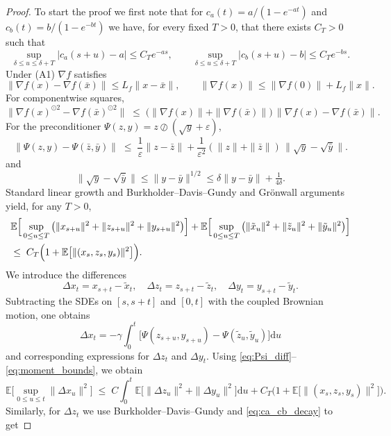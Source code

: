 \documentclass[11pt, a4paper,leqno]{amsart}
\theoremstyle{definition}
\numberwithin{equation}{section}
\begin{document}
\begin{proof}
To start the proof we first note that for $c_a(t)=a/(1-e^{-at})$ and $c_b(t)=b/(1-e^{-bt})$ we have, for every fixed $T>0$, that there exists $C_T>0$ such that
\begin{equation}\label{eq:ca_cb_decay}
\sup_{\delta\le u\le \delta+T}\bigl|c_a(s+u)-a\bigr| \le C_T e^{-as},\qquad
\sup_{\delta\le u\le \delta+T}\bigl|c_b(s+u)-b\bigr| \le C_T e^{-bs}.
\end{equation}
Under (A1)  $\nabla f$ satisfies
\[
\|\nabla f(x)-\nabla f(\bar x)\|\le L_f\|x-\bar x\|,\qquad
\|\nabla f(x)\|\le \|\nabla f(0)\|+L_f\|x\|.
\]
For componentwise squares,
\begin{equation}\label{eq:square_diff}
\|\nabla f(x)^{\odot 2}-\nabla f(\bar x)^{\odot 2}\|
\;\le\; \big(\|\nabla f(x)\|+\|\nabla f(\bar x)\|\big)\,\|\nabla f(x)-\nabla f(\bar x)\|.
\end{equation}
For the preconditioner $\Psi(z,y)=z\oslash(\sqrt{y}+\varepsilon)$,
\begin{equation}\label{eq:Psi_diff}
\|\Psi(z,y)-\Psi(\bar z,\bar y)\|
\;\le\; \frac{1}{\varepsilon}\|z-\bar z\|
+\frac{1}{\varepsilon^2}(\|z\|+\|\bar z\|)\,\|\sqrt{y}-\sqrt{\bar y}\|.
\end{equation}
and
\[
\|\sqrt{y}-\sqrt{\bar y}\|\le\|y-\bar y\|^{1/2}\le \delta\|y-\bar y\|+\tfrac{1}{4\delta}.
\]
Standard linear growth and Burkholder–Davis–Gundy and Grönwall arguments yield, for any $T>0$,
\begin{align}\label{eq:moment_bounds}
&\mathbb{E}\Big[\sup_{0\le u\le T}\big(\|x_{s+u}\|^2+\|z_{s+u}\|^2+\|y_{s+u}\|^2\big)\Big]
+\mathbb{E}\Big[\sup_{0\le u\le T}\big(\|\tilde x_u\|^2+\|\tilde z_u\|^2+\|\tilde y_u\|^2\big)\Big]\notag\\
&\le\; C_T\Big(1+\mathbb{E}\bigl [\|(x_s,z_s,y_s)\|^2\bigr ]\Big).
\end{align}
We introduce the differences
\[
\Delta x_t=x_{s+t}-\tilde x_t,\quad
\Delta z_t=z_{s+t}-\tilde z_t,\quad
\Delta y_t=y_{s+t}-\tilde y_t.
\]
Subtracting the SDEs on $[s,s+t]$ and $[0,t]$ with the coupled Brownian motion, one obtains
\[
\Delta x_t = -\gamma\int_0^t\bigl[\Psi(z_{s+u},y_{s+u})-\Psi(\tilde z_u,\tilde y_u)\bigr]\mathrm{d}u
\]
and corresponding expressions for $\Delta z_t$ and $\Delta y_t$. Using \eqref{eq:Psi_diff}–\eqref{eq:moment_bounds}, we obtain
\[
\mathbb{E}\Big[\sup_{0\le u\le t}\|\Delta x_u\|^2\Big]
\;\le\; C \int_0^t \mathbb{E}\big[\|\Delta z_u\|^2+\|\Delta y_u\|^2\big]\mathrm{d}u
+ C_T\big(1+\mathbb{E}\bigl [\|(x_s,z_s,y_s)\|^2\bigr ]\big).
\]
Similarly, for $\Delta z_t$ we use Burkholder–Davis–Gundy and \eqref{eq:ca_cb_decay} to get

\end{proof}
\end{document}
